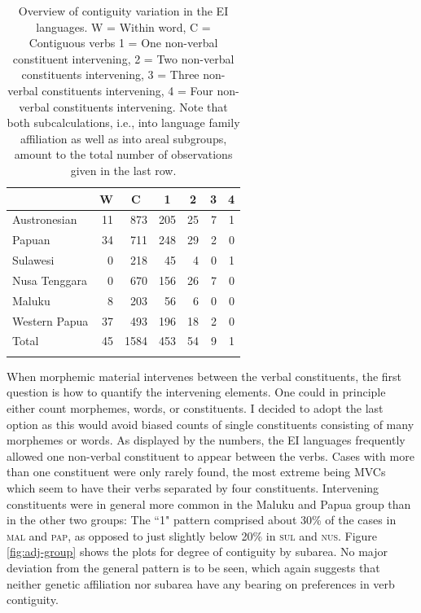 \begin{table}
\begin{tabular}{lrrrrrr}
  \lsptoprule
 & \multicolumn{1}{c}{W} & \multicolumn{1}{c}{C} & \multicolumn{1}{c}{1} & \multicolumn{1}{c}{2} & \multicolumn{1}{c}{3} & \multicolumn{1}{c}{4} \tabularnewline 
  \midrule
   Austronesian &   11 & 873 & 205 &  25 &  7 & 1 \tabularnewline 
   Papuan &  34 & 711 & 248 &  29 & 2 & 0 \tabularnewline 
   \midrule
   Sulawesi &   0 & 218 &  45 &   4 &   0 &   1 \tabularnewline
   Nusa Tenggara &   0 & 670 & 156 &  26 &   7 &   0 \tabularnewline
   Maluku &   8 &  203 &  56 &  6 &   0 &   0 \tabularnewline 
   Western Papua &  37 & 493 & 196 &  18 &   2 &   0 \tabularnewline 
   \midrule
   Total & 45 & 1584 & 453 & 54 & 9 & 1 \tabularnewline
\lspbottomrule
\end{tabular}
\caption[Contiguity variation in the EI corpus]{Overview of contiguity variation in the EI languages. W = Within word, C = Contiguous verbs 1 = One non-verbal constituent intervening, 2 = Two non-verbal constituents intervening, 3 = Three non-verbal constituents intervening, 4 = Four non-verbal constituents intervening. Note that both subcalculations, i.e., into language family affiliation as well as into areal subgroups, amount to the total number of observations given in the last row.}
\label{table:Contiguity_overview}
\end{table}

When morphemic material intervenes between the verbal constituents, the first question is how to quantify the intervening elements. One could in principle either count morphemes, words, or constituents. I decided to adopt the last option as this would avoid biased counts of single constituents consisting of many morphemes or words. As displayed by the numbers, the EI languages frequently allowed one non-verbal constituent to appear between the verbs. Cases with more than one constituent were only rarely found, the most extreme being MVCs which seem to have their verbs separated by four constituents. Intervening constituents were in general more common in the Maluku and Papua group than in the other two groups: The ``1" pattern comprised about 30\% of the cases in  \textsc{mal} and \textsc{pap}, as opposed to just slightly below 20\% in \textsc{sul} and \textsc{nus}. Figure \ref{fig:adj-group} shows the plots for degree of contiguity by subarea. No major deviation from the general pattern is to be seen, which again suggests that neither genetic affiliation nor subarea have any bearing on preferences in verb contiguity.

